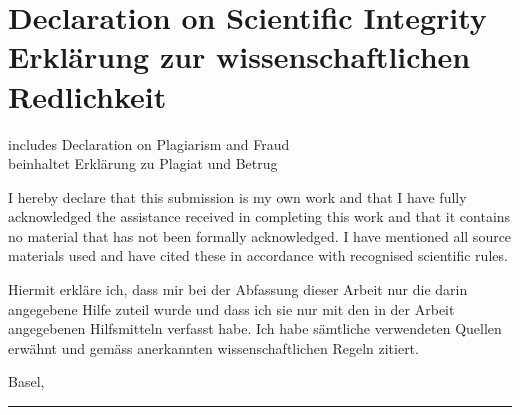 \chapter[Declaration on Scientific Integrity]{Declaration on Scientific Integrity\\Erklärung zur wissenschaftlichen Redlichkeit}
\label{DeclarationOfAuthorship}

includes Declaration on Plagiarism and Fraud \\
beinhaltet Erklärung zu Plagiat und Betrug \vspace{1cm}

\authorsint

\immatriculnrint

\titleint

\thesistypeint

I hereby declare that this submission is my own work and that I have fully acknowledged the assistance received in completing this work and that it contains no material that has not been formally acknowledged. 
I have mentioned all source materials used and have cited these in accordance with recognised scientific rules.

\vspace{0.3cm}

Hiermit erkläre ich, dass mir bei der Abfassung dieser Arbeit nur die darin angegebene 
Hilfe zuteil wurde und dass ich sie nur mit den in der Arbeit angegebenen Hilfsmitteln 
verfasst habe. Ich habe sämtliche verwendeten Quellen erwähnt und gemäss anerkannten wissenschaftlichen Regeln zitiert. 


\vspace*{0.5cm}

Basel, \dateint
\vspace*{0.25cm}

\begin{flushright}
\rule{75mm}{0.4pt} \\
\end{flushright}
